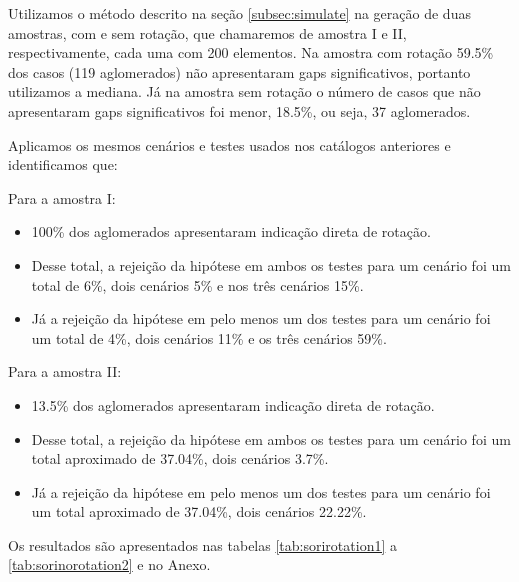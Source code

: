 Utilizamos o método descrito na seção \ref{subsec:simulate} na geração de duas amostras, com e sem rotação, que chamaremos de amostra I e II, respectivamente, cada uma com 200 elementos. Na amostra com rotação 59.5\% dos casos (119 aglomerados) não apresentaram gaps significativos, portanto utilizamos a mediana. Já na amostra sem rotação o número de casos que não apresentaram gaps significativos foi menor, 18.5\%, ou seja, 37 aglomerados.

Aplicamos os mesmos cenários e testes usados nos catálogos anteriores e identificamos que:

Para a amostra I:
\begin{itemize}
	\item 100\% dos aglomerados apresentaram indicação direta de rotação.
   	\item Desse total, a rejeição da hipótese em ambos os testes para um cenário foi um total de 6\%, dois cenários 5\% e nos três cenários 15\%.
   	\item Já a rejeição da hipótese em pelo menos um dos testes para um cenário foi um total de 4\%, dois cenários 11\% e os três cenários 59\%. 
 \end{itemize} 

Para a amostra II:
\begin{itemize}
   	\item 13.5\% dos aglomerados apresentaram indicação direta de rotação.
   	\item Desse total, a rejeição da hipótese em ambos os testes para um cenário foi um total aproximado de 37.04\%, dois cenários 3.7\%.
   	\item Já a rejeição da hipótese em pelo menos um dos testes para um cenário foi um total aproximado de 37.04\%, dois cenários 22.22\%. 
 \end{itemize} 

 Os resultados são apresentados nas tabelas \ref{tab:sorirotation1} a \ref{tab:sorinorotation2} e no Anexo.

